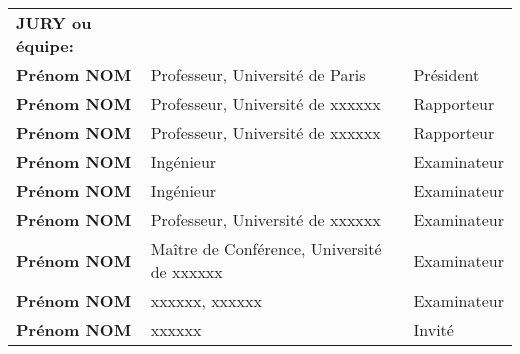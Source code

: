 \begin{footnotesize}
\begin{tabular}{lll}
      {\bf JURY ou équipe:} & &\\[3mm]
      {\bf Prénom NOM}& Professeur, Université de Paris & Président \\
      {\bf Prénom NOM}& Professeur, Université de xxxxxx & Rapporteur \\
      {\bf Prénom NOM}& Professeur, Université de xxxxxx & Rapporteur \\
      {\bf Prénom NOM}& Ingénieur & Examinateur \\
      {\bf Prénom NOM}& Ingénieur & Examinateur \\
      {\bf Prénom NOM}& Professeur, Université de xxxxxx  & Examinateur \\
      {\bf Prénom NOM}& Maître de Conférence, Université de xxxxxx & Examinateur \\      
      {\bf Prénom NOM}& xxxxxx, xxxxxx & Examinateur \\
      {\bf Prénom NOM}& xxxxxx & Invité \\
\end{tabular}
\end{footnotesize}